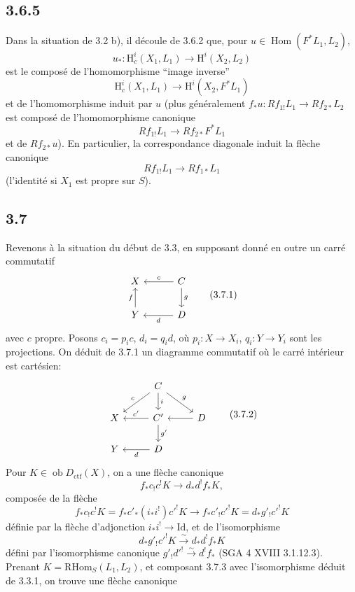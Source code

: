 \documentclass[11pt]{article}
\renewcommand{\H}{\mathrm{H}}
\DeclareMathOperator{\Hom}{Hom}
\newcommand{\ob}{\operatorname{ob}}
\providecommand{\RHom}{\mathrm{RHom}}
\providecommand{\Dctf}{D_{\mathrm{ctf}}}
\providecommand{\Id}{\mathrm{Id}}
\providecommand{\Dctf}{D_{\mathrm{ctf}}}
\providecommand{\RHom}{\mathrm{RHom}}
\providecommand{\Hom}{\operatorname{Hom}}
\providecommand{\ob}{\operatorname{ob}}
\providecommand{\RHom}{\mathrm R\mathcal{H}om}
\providecommand{\RHom}{\mathrm{RHom}}
\providecommand{\Hom}{\operatorname{Hom}}
\begin{document}
\subsection*{3.6.5}
Dans la situation de 3.2 b), il découle de 3.6.2 que, pour $u\in\Hom(F^*L_1,L_2)$,
\[
u_*:\H_c^i(X_1,L_1)\longrightarrow \H^i(X_2,L_2)
\]
est le composé de l'homomorphisme ``image inverse''
\[
\H_c^i(X_1,L_1)\longrightarrow \H^i(X_2,F^*L_1)
\]
et de l'homomorphisme induit par $u$ (plus généralement $f_*u:Rf_{1!}L_1\to Rf_{2*}L_2$ est composé de l'homomorphisme canonique
\[
Rf_{1!}L_1\longrightarrow Rf_{2*}F^*L_1
\]
et de $Rf_{2*}u$). En particulier, la correspondance diagonale induit la flèche canonique
\[
Rf_{1!}L_1\longrightarrow Rf_{1*}L_1
\]
(l'identité si $X_1$ est propre sur $S$).

\subsection*{3.7}
Revenons à la situation du début de 3.3, en supposant donné en outre un carré commutatif
\begin{equation}
\begin{tikzcd}[column sep=3em,row sep=2em]
X & C \arrow[l,"c"'] \arrow[d,"g"] \\
Y \arrow[u,"f"] & D \arrow[l,"d"]
\end{tikzcd}
\tag{3.7.1}
\end{equation}
avec $c$ propre. Posons $c_i=p_ic$, $d_i=q_id$, où $p_i:X\to X_i$, $q_i:Y\to Y_i$ sont les projections. On déduit de 3.7.1 un diagramme commutatif où le carré intérieur est cartésien:
\begin{equation}
\begin{tikzcd}[column sep=2.6em,row sep=1.8em]
& C \arrow[dl,"c"'] \arrow[d,"i"] \arrow[dr,"g"] & \\
X & C' \arrow[l,"c'"'] \arrow[d,"g'"] & D \arrow[l] \\
Y & D \arrow[l,"d"] &
\end{tikzcd}
\tag{3.7.2}
\end{equation}
Pour $K\in\ob\Dctf(X)$, on a une flèche canonique
\begin{equation}
f_*c_!c^!K\longrightarrow d_*d^!f_*K,
\tag{3.7.3}
\end{equation}
composée de la flèche
\[
f_*c_!c^!K=f_*c'_*(i_*i^!)c'^!K\longrightarrow f_*c'_!c'^!K=d_*g'_!c'^!K
\]
définie par la flèche d'adjonction $i_*i^!\to\Id$, et de l'isomorphisme
\[
d_*g'_!c'^!K\xrightarrow{\sim}d_*d^!f_*K
\]
défini par l'isomorphisme canonique $g'_!d'^!\xrightarrow{\sim}d^!f_*$ (SGA 4 XVIII 3.1.12.3). Prenant $K=\RHom_S(L_1,L_2)$, et composant 3.7.3 avec l'isomorphisme déduit de 3.3.1, on trouve une flèche canonique
\end{document}
